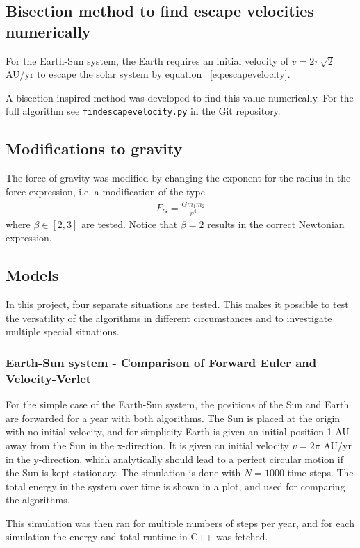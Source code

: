 \documentclass[aps,reprint]{revtex4-1}
\begin{document}
\subsection{Bisection method to find escape velocities numerically}
For the Earth-Sun system, the Earth requires an initial velocity of
$v = 2 \pi \sqrt{2}$ AU/yr to escape the solar system by equation ~\ref{eq:escapevelocity}.

A bisection inspired method was developed to find this value numerically. For the
full algorithm see \texttt{findescapevelocity.py} in the Git repository.

\subsection{Modifications to gravity}
The force of gravity was modified by changing the exponent for the radius
in the force expression, i.e. a modification of the type
\begin{align*}
  \tilde{F}_G = \frac{G m_1 m_2}{r^\beta}
\end{align*}
where $\beta \in [2,3]$ are tested. Notice that $\beta = 2$ results in the correct
Newtonian expression.

\subsection{Models}
In this project, four separate situations are tested. This makes it possible to test the versatility of the
algorithms in different circumstances and to investigate multiple special situations.
\subsubsection{Earth-Sun system - Comparison of Forward Euler and Velocity-Verlet}
\label{seq:earthsunmethod}
For the simple case of the Earth-Sun system, the positions of the Sun and Earth are
forwarded for a year with both algorithms. The Sun is placed at the origin with
no initial velocity, and for simplicity Earth is given an initial position 1 AU
away from the Sun in the x-direction. It is given an initial velocity $v = 2\pi$ AU/yr
in the y-direction, which analytically should lead to a perfect circular motion
if the Sun is kept stationary. The simulation is done with $N = 1000$ time steps.
The total energy in the system over time is shown in a plot, and used for
comparing the algorithms.

This simulation was then ran for multiple numbers of steps per year, and for
each simulation the energy and total runtime in C++ was fetched.
\end{document}
